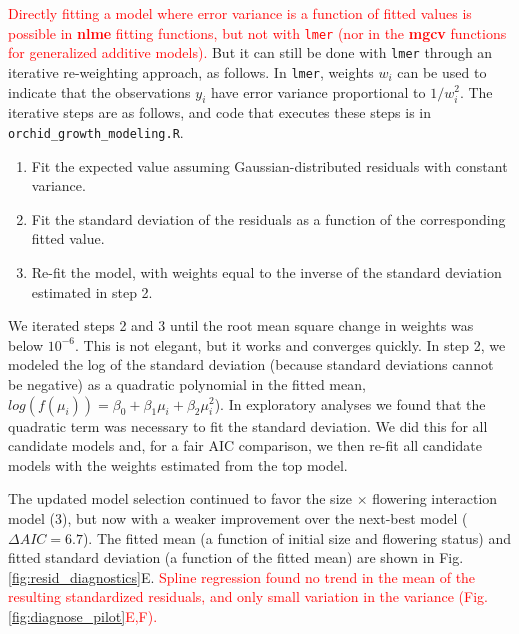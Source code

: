 \documentclass[12pt]{article}
\newcommand{\new}{\textcolor{red}}
\begin{document}
\new{Directly fitting a model where error variance is a function of fitted values is possible in \textbf{nlme} fitting functions, but not with \texttt{lmer} (nor 
in the \textbf{mgcv} functions for generalized additive models). }
But it can still be done with \texttt{lmer} through an iterative re-weighting approach, as follows. 
In \texttt{lmer}, weights $w_{i}$ can be used to indicate that the observations $y_{i}$ have error variance proportional to $1/w_i^2$. 
The iterative steps are as follows, and code that executes these steps is in \texttt{orchid\_growth\_modeling.R}. 
\begin{enumerate}
	\item Fit the expected value assuming Gaussian-distributed residuals with constant variance. 
	\item Fit the standard deviation of the residuals as a function of the corresponding fitted value. 
	\item Re-fit the model, with weights equal to the inverse of the standard deviation estimated in step 2. 
\end{enumerate}
We iterated steps 2 and 3 until the root mean square change in weights was below $10^{-6}$. This is not elegant, but it works and converges quickly. 
In step 2, we modeled the log of the standard deviation (because standard deviations cannot be negative) as a quadratic polynomial in the fitted mean, $log(f(\mu_{i}))=\beta_{0}+\beta_{1}\mu_{i}+\beta_{2}\mu_{i}^2$).  In exploratory analyses we found that the quadratic term was necessary to fit the standard deviation. 
We did this for all candidate models and, for a fair AIC comparison, we then re-fit all candidate models with the weights estimated from the top model. 

The updated model selection continued to favor the size $\times$ flowering interaction model (3), but now with a weaker improvement over the next-best model ($\Delta AIC = 6.7$). 
The fitted mean (a function of initial size and flowering status) and fitted standard deviation (a function of the fitted mean) are shown in Fig. \ref{fig:resid_diagnostics}E. 
\new{Spline regression found no trend in the mean of the resulting standardized residuals, and only small variation in the variance (Fig. \ref{fig:diagnose_pilot}E,F).}  
\end{document}
